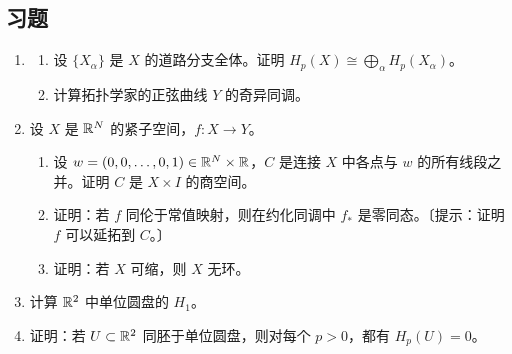 \subsection*{习题}
\begin{enumerate}
\item \begin{enumerate}[label=(\alph*)]
\item 设 $\{X_\alpha\}$ 是 $X$ 的道路分支全体。证明 $H_p(X)\cong\bigoplus_\alpha H_p(X_\alpha)$。
\item 计算拓扑学家的正弦曲线 $Y$ 的奇异同调。
\end{enumerate}
\item 设 $X$ 是 $\mathbb{R}^N$ 的紧子空间，$f:X\to Y$。
\begin{enumerate}[label=(\alph*)]
\item 设 $w=(0,0,\ldots,0,1)\in\mathbb{R}^N\times\mathbb{R}$，$C$ 是连接 $X$ 中各点与 $w$ 的所有线段之并。证明 $C$ 是 $X\times I$ 的商空间。
\item 证明：若 $f$ 同伦于常值映射，则在约化同调中 $f_*$ 是零同态。〔提示：证明 $f$ 可以延拓到 $C$。〕
\item 证明：若 $X$ 可缩，则 $X$ 无环。
\end{enumerate}
\item 计算 $\mathbb{R}^2$ 中单位圆盘的 $H_1$。
\item 证明：若 $U\subset\mathbb{R}^2$ 同胚于单位圆盘，则对每个 $p>0$，都有 $H_p(U)=0$。
\end{enumerate}
